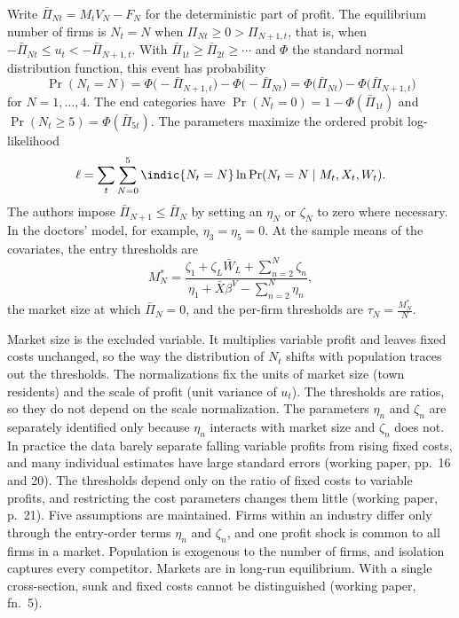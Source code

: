 Write $\bar\Pi_{Nt} = M_t V_N - F_N$ for the deterministic part of profit. The equilibrium number of firms is
$N_t = N$ when $\Pi_{Nt} \ge 0 > \Pi_{N+1, t}$, that is, when $-\bar\Pi_{Nt} \le u_t < -\bar\Pi_{N+1, t}$.
With $\bar\Pi_{1t} \ge \bar\Pi_{2t} \ge \cdots$ and $\Phi$ the standard normal distribution function, this event
has probability
\[
  \Pr(N_t = N) = \Phi\big(-\bar\Pi_{N+1, t}\big) - \Phi\big(-\bar\Pi_{Nt}\big)
               = \Phi\big(\bar\Pi_{Nt}\big) - \Phi\big(\bar\Pi_{N+1, t}\big)
\]
for $N = 1, \dots, 4$. The end categories have $\Pr(N_t = 0) = 1 - \Phi(\bar\Pi_{1t})$ and
$\Pr(N_t \ge 5) = \Phi(\bar\Pi_{5t})$. The parameters maximize the ordered probit log-likelihood
\[
  \ell = \sum_{t} \sum_{N=0}^{5} \indic\{N_t = N\} \ln \Pr(N_t = N \mid M_t, X_t, W_t) .
\]
The authors impose $\bar\Pi_{N+1} \le \bar\Pi_N$ by setting an $\eta_N$ or $\zeta_N$ to zero where necessary. In
the doctors' model, for example, $\eta_3 = \eta_5 = 0$. At the sample means of the covariates, the entry
thresholds are
\begin{equation}\label{eq:01-br-threshold}
  M_N^* = \frac{\zeta_1 + \zeta_L \bar W_L + \sum_{n=2}^{N}\zeta_n}{\eta_1 + \bar X\beta^V - \sum_{n=2}^{N}\eta_n} ,
\end{equation}
the market size at which $\bar\Pi_N = 0$, and the per-firm thresholds are $\tau_N = \frac{M_N^*}{N}$.

Market size is the excluded variable. It multiplies variable profit and leaves fixed costs unchanged, so the
way the distribution of $N_t$ shifts with population traces out the thresholds. The normalizations fix the
units of market size (town residents) and the scale of profit (unit variance of $u_t$). The thresholds are
ratios, so they do not depend on the scale normalization. The parameters $\eta_n$ and $\zeta_n$ are
separately identified only because $\eta_n$ interacts with market size and $\zeta_n$ does not. In practice
the data barely separate falling variable profits from rising fixed costs, and many individual estimates have
large standard errors (working paper, pp.~16 and 20). The thresholds depend only on the ratio of fixed costs
to variable profits, and restricting the cost parameters changes them little (working paper, p.~21). Five
assumptions are maintained. Firms within an industry differ only through the entry-order terms $\eta_n$ and
$\zeta_n$, and one profit shock is common to all firms in a market. Population is exogenous to the number of firms, and isolation captures every competitor. Markets
are in long-run equilibrium. With a single cross-section, sunk and fixed costs cannot be distinguished (working
paper, fn.~5).

